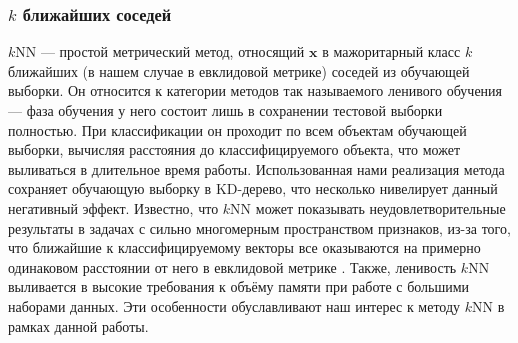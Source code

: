 \subsubsection{\(k\) ближайших соседей}
\(k\)NN --- простой метрический метод, относящий \(\mathbf{x}\) в мажоритарный класс \(k\) ближайших (в нашем случае в евклидовой метрике) соседей из обучающей выборки. Он относится к категории методов так называемого ленивого обучения --- фаза обучения у него состоит лишь в сохранении тестовой выборки полностью. При классификации он проходит по всем объектам обучающей выборки, вычисляя расстояния до классифицируемого объекта, что может выливаться в длительное время работы. Использованная нами реализация метода сохраняет обучающую выборку в KD-дерево, что несколько нивелирует данный негативный эффект. Известно, что \(k\)NN может показывать неудовлетворительные результаты в задачах с сильно многомерным пространством признаков, из-за того, что ближайшие к классифицируемому векторы все оказываются на примерно одинаковом расстоянии от него в евклидовой метрике \cite{beyer}. Также, ленивость \(k\)NN выливается в высокие требования к объёму памяти при работе с большими наборами данных. Эти особенности обуславливают наш интерес к методу \(k\)NN в рамках данной работы.


